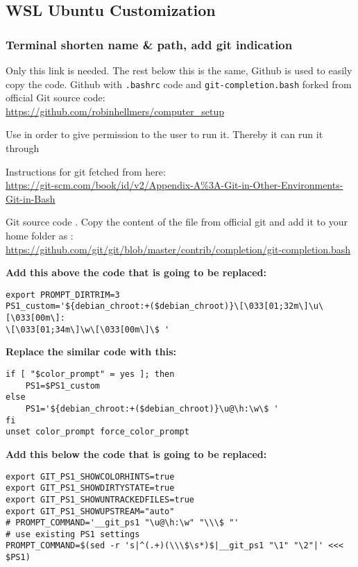 \subsection{WSL Ubuntu Customization}

\subsubsection{Terminal shorten name \& path, add git indication}
Only this link is needed. The rest below this is the same, Github is used to easily copy the code. Github with \texttt{.bashrc} code and \texttt{git-completion.bash} forked from official Git source code:\\
\url{https://github.com/robinhellmers/computer_setup}

Use  in order to give permission to the user to run it. Thereby it can run it through 

Instructions for git fetched from here:\\
\url{https://git-scm.com/book/id/v2/Appendix-A\%3A-Git-in-Other-Environments-Git-in-Bash}

Git source code . Copy the content of the file from official git and add it to your home folder as :\\
\url{https://github.com/git/git/blob/master/contrib/completion/git-completion.bash}



\textbf{Add this above the code that is going to be replaced:}
\begin{verbatim}
export PROMPT_DIRTRIM=3
PS1_custom='${debian_chroot:+($debian_chroot)}\[\033[01;32m\]\u\[\033[00m\]:
\[\033[01;34m\]\w\[\033[00m\]\$ '
\end{verbatim}

\textbf{Replace the similar code with this:}
\begin{verbatim}
if [ "$color_prompt" = yes ]; then
    PS1=$PS1_custom
else
    PS1='${debian_chroot:+($debian_chroot)}\u@\h:\w\$ '
fi
unset color_prompt force_color_prompt
\end{verbatim}

\textbf{Add this below the code that is going to be replaced:}
\begin{verbatim}
export GIT_PS1_SHOWCOLORHINTS=true
export GIT_PS1_SHOWDIRTYSTATE=true
export GIT_PS1_SHOWUNTRACKEDFILES=true
export GIT_PS1_SHOWUPSTREAM="auto"
# PROMPT_COMMAND='__git_ps1 "\u@\h:\w" "\\\$ "'
# use existing PS1 settings
PROMPT_COMMAND=$(sed -r 's|^(.+)(\\\$\s*)$|__git_ps1 "\1" "\2"|' <<< $PS1)
\end{verbatim}

